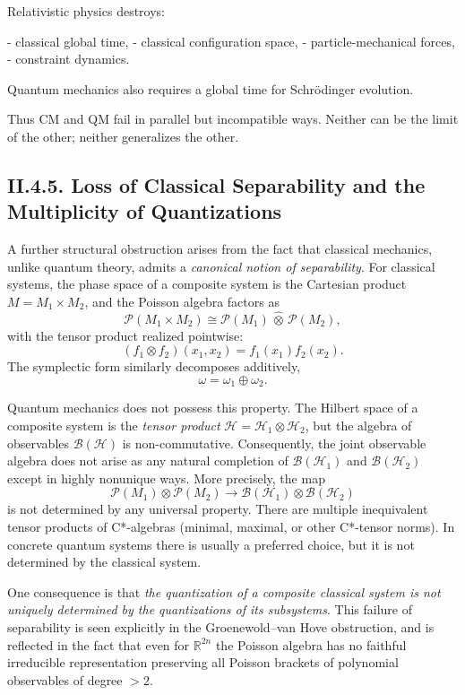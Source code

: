 \documentclass[12pt,oneside]{book}
\theoremstyle{plain}
\theoremstyle{definition}
\begin{document}
Relativistic physics destroys:

- classical global time,
- classical configuration space,
- particle-mechanical forces,
- constraint dynamics.

Quantum mechanics also requires a global time for Schrödinger evolution.

Thus CM and QM fail in parallel but incompatible ways.  
Neither can be the limit of the other; neither generalizes the other.



\subsection*{II.4.5. Loss of Classical Separability and the Multiplicity of Quantizations}

A further structural obstruction arises from the fact that classical mechanics,
unlike quantum theory, admits a \emph{canonical notion of separability}. For
classical systems, the phase space of a composite system is the Cartesian
product $M = M_1 \times M_2$, and the Poisson algebra factors as
\[
\mathcal{P}(M_1 \times M_2) \cong \mathcal{P}(M_1)\,\widehat{\otimes}\,\mathcal{P}(M_2),
\]
with the tensor product realized pointwise:
\[
(f_1 \otimes f_2)(x_1,x_2)=f_1(x_1)f_2(x_2).
\]
The symplectic form similarly decomposes additively,
\[
\omega = \omega_1 \oplus \omega_2.
\]

Quantum mechanics does not possess this property.  
The Hilbert space of a composite system is the \emph{tensor product}
$\mathcal{H} = \mathcal{H}_1\otimes\mathcal{H}_2$, but the algebra of
observables $\mathcal{B}(\mathcal{H})$ is non-commutative. Consequently, the
joint observable algebra does not arise as any natural completion of
$\mathcal{B}(\mathcal{H}_1)$ and $\mathcal{B}(\mathcal{H}_2)$ except in
highly nonunique ways. More precisely, the map
\[
\mathcal{P}(M_1)\otimes\mathcal{P}(M_2) \to \mathcal{B}(\mathcal{H}_1)\otimes\mathcal{B}(\mathcal{H}_2)
\]
is not determined by any universal property. There are multiple inequivalent
tensor products of C*-algebras (minimal, maximal, or other C*-tensor norms).
In concrete quantum systems there is usually a preferred choice, but it is not
determined by the classical system.  

One consequence is that \emph{the quantization of a composite classical system
is not uniquely determined by the quantizations of its subsystems}.  
This failure of separability is seen explicitly in the Groenewold–van Hove
obstruction, and is reflected in the fact that even for $\mathbb{R}^{2n}$ the
Poisson algebra has no faithful irreducible representation preserving all
Poisson brackets of polynomial observables of degree $>2$.  
\end{document}

